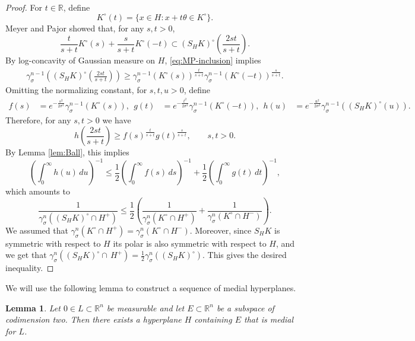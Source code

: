 \documentclass[12pt,oneside,reqno]{amsart}
\numberwithin{equation}{section}
\newtheorem{lemma}[theorem]{Lemma}
\theoremstyle{remark}
\newcommand{\R}{\mathbb R}
\newcommand{\dd}{\,d}
\def\s{\sigma}
\begin{document}
\begin{proof}
 For $t\in\R$, define
\[
        K^\circ(t)=\{x\in H:x+t\theta\in K^\circ\}.
\]
Meyer and Pajor \cite{MeyerPajorBlaschke} showed that, for any $s,t>0$,
\begin{equation}\label{eq:MP-inclusion}
        \frac{t}{s+t}K^\circ(s)+\frac{s}{s+t}K^\circ(-t)
        \subset
        (S_HK)^\circ\left(\frac{2st}{s+t}\right).
\end{equation}
By log-concavity of Gaussian measure on $H$, \eqref{eq:MP-inclusion} implies
\[
\begin{aligned}
\gamma_\sigma^{n-1}\left((S_HK)^\circ\left(\frac{2st}{s+t}\right)\right)        \ge
\gamma_\sigma^{n-1}(K^\circ(s))^{\frac{t}{s+t}}
\gamma_\sigma^{n-1}(K^\circ(-t))^{\frac{s}{s+t}}.
\end{aligned}
\]
Omitting the normalizing constant, for $s,t,u>0$, define 
\[
\begin{aligned}
        f(s)&=e^{-\frac{s^2}{2\sigma^2}}\gamma_\sigma^{n-1}(K^\circ(s)), \ \ 
        g(t)&=e^{-\frac{t^2}{2\sigma^2}}\gamma_\sigma^{n-1}(K^\circ(-t)), \ \ 
        h(u)&=e^{-\frac{u^2}{2\sigma^2}}\gamma_\sigma^{n-1}((S_HK)^\circ(u)).
\end{aligned}
\]
Therefore, for any $s,t>0$ we have
\[
        h\left(\frac{2st}{s+t}\right)
        \ge f(s)^{\frac{t}{s+t}}g(t)^{\frac{s}{s+t}},
        \qquad s,t>0.
\]
By Lemma \ref{lem:Ball}, this implies
\[
        \left(\int_0^\infty h(u)\dd u\right)^{-1}
        \le
        \frac12\left(\int_0^\infty f(s)\dd s\right)^{-1}
        +
        \frac12\left(\int_0^\infty g(t)\dd t\right)^{-1},
\]
which amounts to \[
\frac{1}{\gamma_\s^n((S_HK)^\circ\cap H^+)}\le\frac{1}{2}\left(\frac{1}{\gamma_\s^n(K^\circ\cap H^+)}+\frac{1}{\gamma_\s^n(K^\circ\cap H^-)}\right).
\]
We assumed that $\gamma_\s^n(K^\circ\cap H^+)=\gamma_\s^n(K^\circ\cap H^-)$. Moreover, since $S_HK$ is symmetric with respect to $H$ its polar is also symmetric with respect to $H$, and we get that $\gamma_\s^n((S_HK)^\circ \cap\, H^+)= \frac{1}{2}\gamma_\s^n((S_HK)^\circ)$. This gives the desired inequality.
\end{proof}

We will use the following lemma to construct a sequence of medial hyperplanes.

\begin{lemma}\label{lem:medial-containing-subspace}
Let $0\in L\subset\R^n$ be measurable and let $E\subset\R^n$ be a subspace of codimension two. Then there exists a hyperplane $H$ containing $E$ that is medial for $L$.
\end{lemma}
\end{document}
